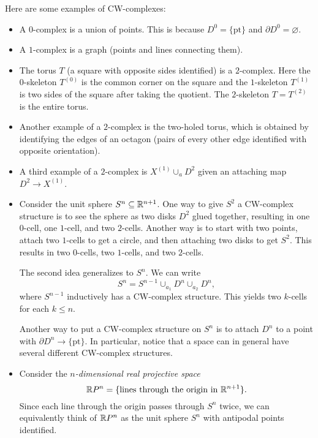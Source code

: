 \begin{example}
  Here are some examples of CW-complexes:
  \begin{itemize}
    \item A $0$-complex is a union of points.
      This is because $D^0 = \{\text{pt}\}$ and
      $\partial D^0 = \varnothing$.
    \item A $1$-complex is a graph (points and lines
      connecting them).
    \item The torus $T$ (a square with opposite sides
      identified) is a $2$-complex. Here
      the $0$-skeleton $T^{(0)}$ is the common corner
      on the square and the $1$-skeleton $T^{(1)}$
      is two sides of the square after taking the
      quotient. The $2$-skeleton $T = T^{(2)}$ is the
      entire torus.
    \item Another example of a $2$-complex is the
      two-holed torus, which is obtained by identifying
      the edges of an octagon (pairs of every other
      edge identified with opposite orientation).
    \item A third example of a $2$-complex is
      $X^{(1)} \cup_a D^2$ given an attaching map
      $D^2 \to X^{(1)}$.
    \item Consider the unit sphere $S^n \subseteq \mathbb{R}^{n + 1}$.
      One way to give $S^2$ a CW-complex structure is
      to see the sphere as two disks $D^2$ glued together,
      resulting in one $0$-cell, one $1$-cell, and two
      $2$-cells. Another way is to start with
      two points, attach two $1$-cells to get a circle,
      and then attaching two disks to get $S^2$. This
      results in two $0$-cells, two $1$-cells, and two
      $2$-cells.

      The second idea generalizes to $S^n$. We can
      write
      \[
        S^n = S^{n - 1} \cup_{a_1} D^n \cup_{a_2} D^n,
      \]
      where $S^{n - 1}$ inductively has a CW-complex
      structure. This yields two $k$-cells for each
      $k \le n$.

      Another way to put a CW-complex structure
      on $S^n$ is to attach $D^n$ to a point with
      $\partial D^n \to \{\text{pt}\}$.
      In particular, notice that a space
      can in general have several different CW-complex
      structures.
    \item Consider the \emph{$n$-dimensional real projective space}
      \[
        \mathbb{R} P^n = \{\text{lines through the origin in } \mathbb{R}^{n + 1}\}.
      \]
      Since each line through the origin passes through
      $S^n$ twice, we can equivalently think of $\mathbb{R} P^n$
      as the unit sphere $S^n$ with antipodal points
      identified.


\end{itemize}
\end{example}
